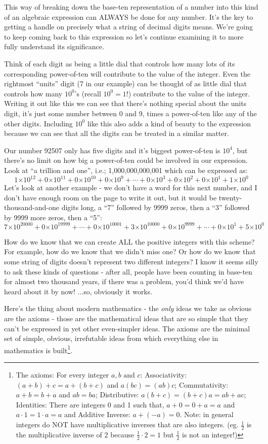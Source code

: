 \documentclass{article}
\begin{document}
This way of breaking down the base-ten representation of a number into
this kind of an algebraic expression can ALWAYS be done for any number. It's the key to getting
a handle on precisely what a string of decimal digits means. We're going to keep coming
back to this expression so let's continue examining it to more fully understand its significance.

Think of each digit as being a little dial that controls how many lots
of its corresponding power-of-ten will contribute to the value of the integer.
Even the rightmost ``units'' digit (7 in our example) can be thought of as little dial
that controls how many $10^0$'s (recall $10^0 = 1$!) contribute to the value of the integer.
Writing it out like this we can see that there's nothing special about the units digit,
it's just some number between 0 and 9, times a power-of-ten like any of the other digits.
Including $10^0$ like this also adds a kind of beauty to the expression because
we can see that all
the digits can be treated in a similar matter.

Our number 92507 only has five digits and it's biggest power-of-ten is $10^4$,
but there's
no limit on how big a power-of-ten could be involved in our expression.
Look at ``a trillion and one'', i.e.; 1,000,000,000,001 which can be expressed as:
\[1{\times{}}10^{12}+0{\times{}}10^{11}+0{\times{}}10^{10}+0{\times{}}10^{9}+\cdots{}+0{\times{}}10^{3}+0{\times{}}10^{2}+0{\times{}}10^{1}+1{\times{}}10^{0}\]
Let's look at another example - we don't have a word for this next number,
and I don't have enough room on the page to write it out,
but it would be twenty-thousand-and-one digits long, a
``7'' followed by 9999 zeros, then a ``3''
followed by 9999 more zeros, then a ``5'':
\[
7{\times{}}10^{20000}+0{\times{}}10^{19999}+\cdots{}+0{\times{}}10^{10001}+3{\times{}}10^{10000}+0{\times{}}10^{9999}+\cdots{}+0{\times{}}10^{1}+5{\times{}}10^{0}\]

How do we know that we can create ALL the positive
integers with this scheme? For example,
how do we know that we didn't miss one? Or how do we know that some string of
digits doesn't represent two different integers?
I know it seems silly to ask these kinds of questions - 
after all, people have been counting in base-ten for almost two thousand years,
if there was a problem, you'd think we'd have heard about it by now! ...so, obviously it works.

Here's the thing about modern mathematics - the \emph{only} ideas we take as obvious
are the axioms - those are the mathematical ideas that
are so simple that they can't be expressed in
yet other even-simpler ideas. The axioms are the minimal set of simple,
obvious, irrefutable ideas from which
everything else in mathematics is built\footnote{The axioms:
For every integer $a,b\text{ and }c$:
Associativity: $(a+b)+c=a+(b+c)$ and $a(bc)=(ab)c$;
Commutativity: $a+b=b+a$ and $ab=ba$;
Distributive: $a(b+c)=(b+c)a=ab+ac$;
Identities: There are integers 0 and 1 such that,
$a+0=0+a=a$ and $a\cdot{}1=1\cdot{}a=a$ and
Additive Inverse: $a+(-a)=0$.
Note: in general integers do NOT have multiplicative inverses 
that are also integers. (eg. $\frac{1}{2}$ is the multiplicative
inverse of 2 because $\frac{1}{2}\cdot{}2=1$ but $\frac{1}{2}$ is not an integer!)}.
\end{document}
